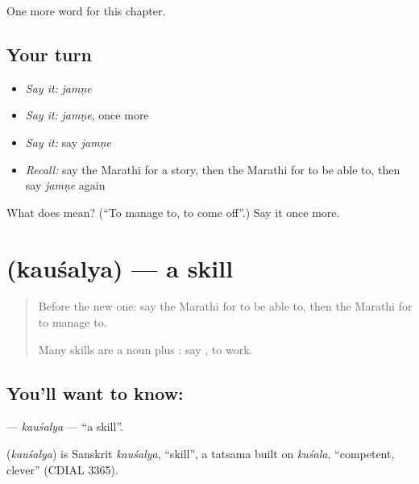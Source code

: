 \begin{grammarlens}[title={What you've built}]
One more word for this chapter.
\end{grammarlens}

\subsection*{Your turn}
\begin{itemize}
\raggedright
  \item \emph{Say it:} \emph{jamṇe}
  \item \emph{Say it:} \emph{jamṇe}, once more
  \item \emph{Say it:} say \emph{jamṇe}
  \item \emph{Recall:} say the Marathi for a story, then the Marathi for to be able to, then say \emph{jamṇe} again
\end{itemize}

\begin{tcolorbox}[breakable,colback=teal!4,colframe=teal!35!black,title={Before you move on}]
What does  mean? (\textquotedblleft{}To manage to, to come off\textquotedblright{}.) Say it once more.
\end{tcolorbox}
\section[\texorpdfstring{\mr{कौशल्य} (kauśalya)}{कौशल्य (kauśalya)}]{ (kauśalya) — a skill}

\label{lesson:MR-C121-kausalya}



\begin{quote}
Before the new one: say the Marathi for to be able to, then the Marathi for to manage to.

Many skills are a noun plus \textbf{}: say \textbf{ }, to work.
\end{quote}

\subsection*{You'll want to know: }
\textbf{} — \emph{kauśalya} — \textquotedblleft{}a skill\textquotedblright{}.

\begin{cousinweb}
\textbf{} (\emph{kauśalya}) is Sanskrit \emph{kauśalya}, \textquotedblleft{}skill\textquotedblright{}, a tatsama built on \emph{kuśala}, \textquotedblleft{}competent, clever\textquotedblright{} (CDIAL 3365).
\end{cousinweb}

